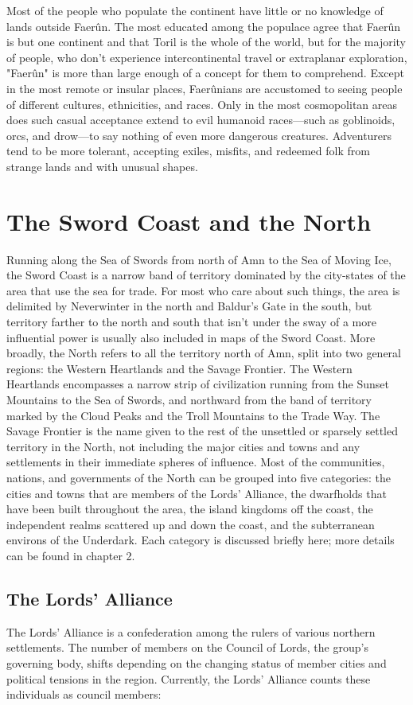 \documentclass[10pt,a4paper,twoside,twocolumn,openany,bg=print,nodeprecatedcode]{dndbook}
\begin{document}
Most of the people who populate the continent have little or no knowledge of lands outside Faerûn. The most educated among the populace agree that Faerûn is but one continent and that Toril is the whole of the world, but for the majority of people, who don't experience intercontinental travel or extraplanar exploration, "Faerûn" is more than large enough of a concept for them to comprehend.
Except in the most remote or insular places, Faerûnians are accustomed to seeing people of different cultures, ethnicities, and races. Only in the most cosmopolitan areas does such casual acceptance extend to evil humanoid races—such as goblinoids, orcs, and drow—to say nothing of even more dangerous creatures. Adventurers tend to be more tolerant, accepting exiles, misfits, and redeemed folk from strange lands and with unusual shapes.
\section{The Sword Coast and the North}
Running along the Sea of Swords from north of Amn to the Sea of Moving Ice, the Sword Coast is a narrow band of territory dominated by the city-states of the area that use the sea for trade. For most who care about such things, the area is delimited by Neverwinter in the north and Baldur's Gate in the south, but territory farther to the north and south that isn't under the sway of a more influential power is usually also included in maps of the Sword Coast.
More broadly, the North refers to all the territory north of Amn, split into two general regions: the Western Heartlands and the Savage Frontier. The Western Heartlands encompasses a narrow strip of civilization running from the Sunset Mountains to the Sea of Swords, and northward from the band of territory marked by the Cloud Peaks and the Troll Mountains to the Trade Way. The Savage Frontier is the name given to the rest of the unsettled or sparsely settled territory in the North, not including the major cities and towns and any settlements in their immediate spheres of influence.
Most of the communities, nations, and governments of the North can be grouped into five categories: the cities and towns that are members of the Lords' Alliance, the dwarfholds that have been built throughout the area, the island kingdoms off the coast, the independent realms scattered up and down the coast, and the subterranean environs of the Underdark. Each category is discussed briefly here; more details can be found in chapter 2.
\subsection{The Lords' Alliance}
The Lords' Alliance is a confederation among the rulers of various northern settlements. The number of members on the Council of Lords, the group's governing body, shifts depending on the changing status of member cities and political tensions in the region. Currently, the Lords' Alliance counts these individuals as council members:
\end{document}
